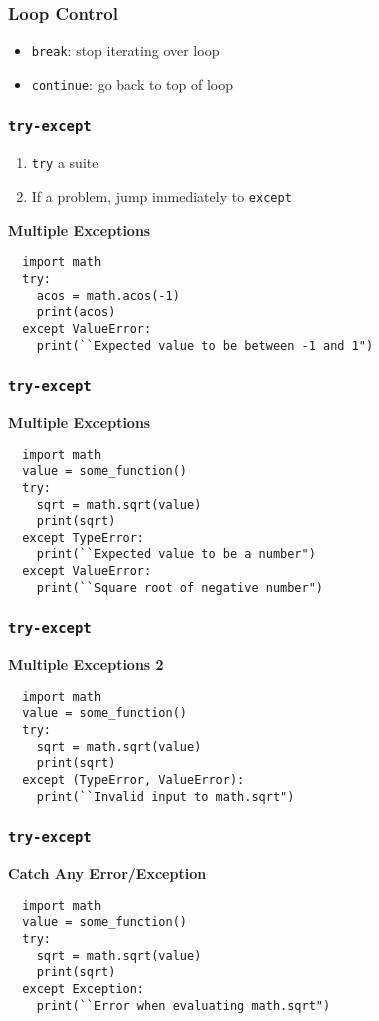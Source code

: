 \documentclass{beamer}
\begin{document}
\begin{frame}
  \frametitle{Loop Control}

  \begin{itemize}
    \item \texttt{break}: stop iterating over loop
    \item \texttt{continue}: go back to top of loop
  \end{itemize}
\end{frame}

\begin{frame}[fragile]
  \frametitle{\texttt{try-except}}

  \begin{enumerate}
    \item \texttt{try} a suite
    \item If a problem, jump immediately to \texttt{except}
  \end{enumerate}

  \textbf{Multiple Exceptions}
  \begin{lstlisting}
  import math
  try:
    acos = math.acos(-1) 
    print(acos)
  except ValueError:
    print(``Expected value to be between -1 and 1")
  \end{lstlisting}
\end{frame}


\begin{frame}[fragile]
  \frametitle{\texttt{try-except}}

  \textbf{Multiple Exceptions}
  \begin{lstlisting}
  import math
  value = some_function()
  try:
    sqrt = math.sqrt(value)
    print(sqrt)
  except TypeError:
    print(``Expected value to be a number")
  except ValueError:
    print(``Square root of negative number")
  \end{lstlisting}
\end{frame}

\begin{frame}[fragile]
  \frametitle{\texttt{try-except}}

  \textbf{Multiple Exceptions 2}
  \begin{lstlisting}
  import math
  value = some_function()
  try:
    sqrt = math.sqrt(value)
    print(sqrt)
  except (TypeError, ValueError):
    print(``Invalid input to math.sqrt")
  \end{lstlisting}
\end{frame}

\begin{frame}[fragile]
  \frametitle{\texttt{try-except}}

  \textbf{Catch Any Error/Exception}
  \begin{lstlisting}
  import math
  value = some_function()
  try:
    sqrt = math.sqrt(value)
    print(sqrt)
  except Exception:
    print(``Error when evaluating math.sqrt")
  \end{lstlisting}
\end{frame}
\end{document}

